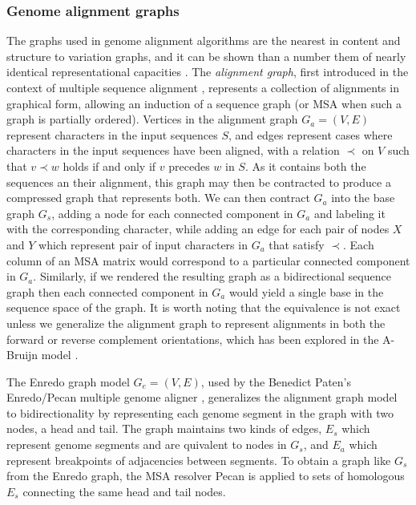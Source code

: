 \subsubsection{Genome alignment graphs}
\label{sec:genome_alignment_graphs}
The graphs used in genome alignment algorithms are the nearest in content and structure to variation graphs, and it can be shown than a number them of nearly identical representational capacities \cite{kehr2014genome}.
The \emph{alignment graph}, first introduced in the context of multiple sequence alignment \cite{kececioglu1993maximum,rausch2008segment}, represents a collection of alignments in graphical form, allowing an induction of a sequence graph (or MSA when such a graph is partially ordered).
Vertices in the alignment graph $G_a = (V, E)$ represent characters in the input sequences $S$, and edges represent cases where characters in the input sequences have been aligned, with a relation $\prec$ on $V$ such that $v \prec w$ holds if and only if $v$ precedes $w$ in $S$.
As it contains both the sequences an their alignment, this graph may then be contracted to produce a compressed graph that represents both.
We can then contract $G_a$ into the base graph $G_s$, adding a node for each connected component in $G_a$ and labeling it with the corresponding character, while adding an edge for each pair of nodes $X$ and $Y$ which represent pair of input characters in $G_a$ that satisfy $\prec$.
Each column of an MSA matrix would correspond to a particular connected component in $G_a$.
Similarly, if we rendered the resulting graph as a bidirectional sequence graph then each connected component in $G_a$ would yield a single base in the sequence space of the graph.
It is worth noting that the equivalence is not exact unless we generalize the alignment graph to represent alignments in both the forward or reverse complement orientations, which has been explored in the A-Bruijn model \cite{raphael2004novel}.

The Enredo graph model $G_e = (V, E)$, used by the Benedict Paten's Enredo/Pecan multiple genome aligner \cite{paten2008enredo}, generalizes the alignment graph model to bidirectionality by representing each genome segment in the graph with two nodes, a head and tail.
The graph maintains two kinds of edges, $E_s$ which represent genome segments and are quivalent to nodes in $G_s$, and $E_a$ which represent breakpoints of adjacencies between segments.
To obtain a graph like $G_s$ from the Enredo graph, the MSA resolver Pecan is applied to sets of homologous $E_s$ connecting the same head and tail nodes.

